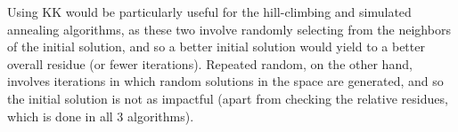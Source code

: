 \documentclass[12pt]{article}
\begin{document}
Using KK would be particularly useful for the hill-climbing and simulated annealing algorithms, as these two involve randomly selecting from the neighbors of the initial solution, and so a better initial solution would yield to a better overall residue (or fewer iterations).  Repeated random, on the other hand, involves iterations in which random solutions in the space are generated, and so the initial solution is not as impactful (apart from checking the relative residues, which is done in all 3 algorithms).
\end{document}
